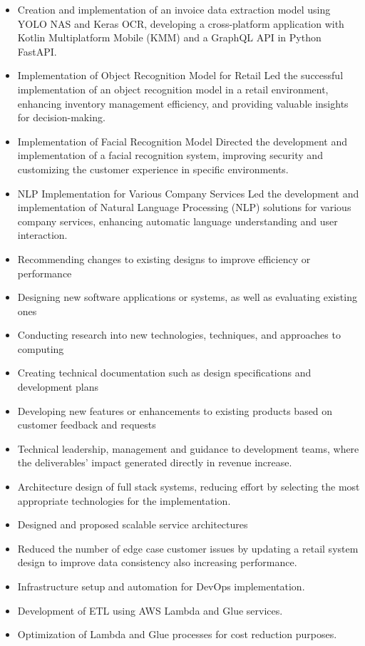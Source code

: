 
\begin{itemize}

  \item Creation and implementation of an invoice data extraction model using YOLO NAS and Keras OCR, developing a cross-platform application with Kotlin Multiplatform Mobile (KMM) and a GraphQL API in Python FastAPI.

  \item Implementation of Object Recognition Model for Retail
 Led the successful implementation of an object recognition model in a retail environment, enhancing inventory management efficiency, and providing valuable insights for decision-making.

  \item Implementation of Facial Recognition Model
 Directed the development and implementation of a facial recognition system, improving security and customizing the customer experience in specific environments.
  \item NLP Implementation for Various Company Services
 Led the development and implementation of Natural Language Processing (NLP) solutions for various company services, enhancing automatic language understanding and user interaction.
  \item Recommending changes to existing designs to improve efficiency or performance
  \item Designing new software applications or systems, as well as evaluating existing ones
  \item Conducting research into new technologies, techniques, and approaches to computing
  \item Creating technical documentation such as design specifications and development plans
  \item Developing new features or enhancements to existing products based on customer feedback and requests
  \item Technical leadership, management and guidance to development teams, where the deliverables’ impact generated directly in revenue increase.
  \item Architecture design of full stack systems, reducing effort by selecting the most appropriate technologies for the implementation.
  \item Designed and proposed scalable service architectures
  \item Reduced the number of edge case customer issues by updating a retail system design to improve data consistency also increasing performance.
  \item Infrastructure setup and automation for DevOps implementation.
  \item Development of ETL using AWS Lambda and Glue services.
  \item Optimization of Lambda and Glue processes for cost reduction purposes.
\end{itemize}

